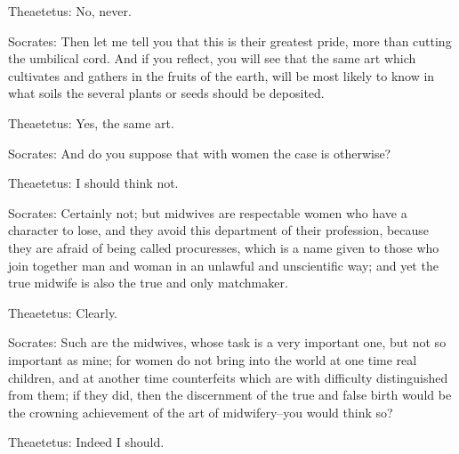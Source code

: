 Theaetetus: No, never.

Socrates: Then let me tell you that this is their greatest pride, more
than cutting the umbilical cord. And if you reflect, you will see that
the same art which cultivates and gathers in the fruits of the earth,
will be most likely to know in what soils the several plants or seeds
should be deposited.

Theaetetus: Yes, the same art.

Socrates: And do you suppose that with women the case is otherwise?

Theaetetus: I should think not.

Socrates: Certainly not; but midwives are respectable women who have a
character to lose, and they avoid this department of their profession,
because they are afraid of being called procuresses, which is a name
given to those who join together man and woman in an unlawful and
unscientific way; and yet the true midwife is also the true and only
matchmaker.

Theaetetus: Clearly.

Socrates: Such are the midwives, whose task is a very important one, but
not so important as mine; for women do not bring into the world at one
time real children, and at another time counterfeits which are with
difficulty distinguished from them; if they did, then the discernment of
the true and false birth would be the crowning achievement of the art of
midwifery--you would think so?

Theaetetus: Indeed I should.

